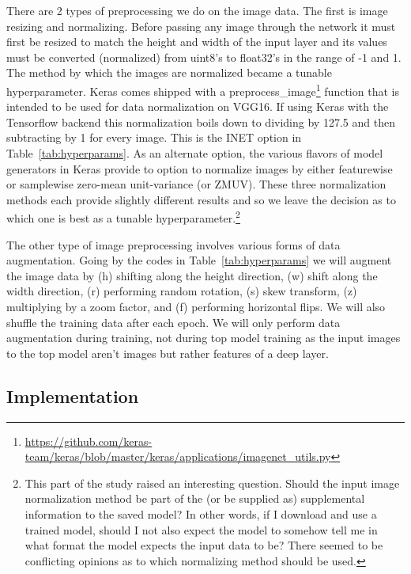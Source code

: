 \documentclass[12pt,journal,compsoc]{IEEEtran}
\begin{document}
There are 2 types of preprocessing we do on the image data. The first is image resizing and normalizing. Before passing any image through the network it must first be resized to match the height and width of the input layer and its values must be converted (normalized) from uint8's to float32's in the range of -1 and 1.  The method by which the images are normalized became a tunable hyperparameter.  Keras comes shipped with a preprocess\_image\footnote{\url{https://github.com/keras-team/keras/blob/master/keras/applications/imagenet_utils.py}} function that is intended to be used for data normalization on VGG16.  If using Keras with the Tensorflow backend this normalization boils down to dividing by 127.5 and then subtracting by 1 for every image.  This is the INET option in Table~\ref{tab:hyperparams}. As an alternate option, the various flavors of model generators in Keras provide to option to normalize images by either featurewise or samplewise zero-mean unit-variance (or ZMUV).  These three normalization methods each provide slightly different results and so we leave the decision as to which one is best as a tunable hyperparameter.\footnote{This part of the study raised an interesting question. Should the input image normalization method be part of the (or be supplied as) supplemental information to the saved model?  In other words, if I download and use a trained model, should I not also expect the model to somehow tell me in what format the model expects the input data to be? There seemed to be conflicting opinions as to which normalizing method should be used.}

The other type of image preprocessing involves various forms of data augmentation.  Going by the codes in Table~\ref{tab:hyperparams} we will augment the image data by (h) shifting along the height direction, (w) shift along the width direction, (r) performing random rotation, (s) skew transform, (z) multiplying by a zoom factor, and (f) performing horizontal flips.  We will also shuffle the training data after each epoch. We will only perform data augmentation during training, not during top model training as the input images to the top model aren't images but rather features of a deep layer.

\subsection{Implementation}
\end{document}
